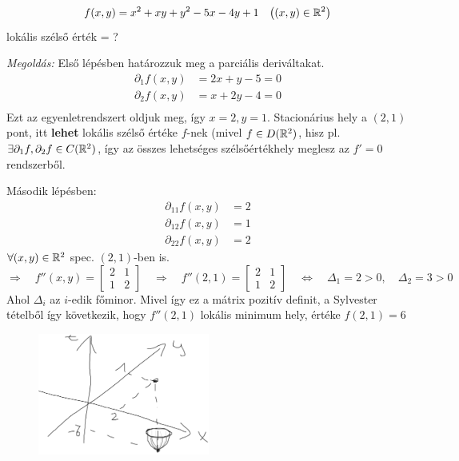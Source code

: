 \documentclass[a4paper,11.5pt]{article}
\begin{document}
	\begin{example}
		\[ f(x,y)=x^2+xy+y^2-5x-4y+1\quad \big((x,y)\in\mathbb{R}^2\big) \]
		lokális szélső érték = ?
		
		\textit{Megoldás:} Első lépésben határozzuk meg a parciális deriváltakat.
		\begin{align*}
			\partial_1f(x,y)&=2x+y-5 = 0\\
			\partial_2f(x,y)&=x+2y-4=0\\
		\end{align*}
		Ezt az egyenletrendszert oldjuk meg, így $x=2, y=1$. Stacionárius hely a $(2,1)$ pont, itt \textbf{lehet} lokális szélső értéke $f$-nek (mivel $f\in D(\mathbb{R}^2)$, hisz pl. $\exists \partial_1f,\partial_2f\in C(\mathbb{R}^2)$, így az összes lehetséges szélsőértékhely meglesz az $f'=0$ rendszerből.
		
		Második lépésben: 
		\begin{align*}
			\partial_{11}f(x,y)&=2 \\
			\partial_{12}f(x,y)&=1 \\
			\partial_{22}f(x,y)&=2 
		\end{align*} 
		$\forall(x,y)\in\mathbb{R}^2$ spec. $(2,1)$-ben is.
		\[ \Rightarrow\quad f''(x,y)=\begin{bmatrix}
			2&1\\
			1&2
		\end{bmatrix}\quad \Rightarrow\quad f''(2,1)=\begin{bmatrix}
			2&1\\
			1&2
		\end{bmatrix}\quad \Leftrightarrow\quad \varDelta_1=2>0,\quad \varDelta_2=3>0 \]
		Ahol $\varDelta_i$ az $i$-edik főminor. Mivel így ez a mátrix pozitív definit, a Sylvester tételből így következik, hogy $f''(2,1)$ lokális minimum hely, értéke $f(2,1)=6$
		\begin{figure}[H]
			\centering
			\includegraphics[height=4cm]{../2zh/kepek/38.png}
			\caption{}
		\end{figure}
	\end{example}
\end{document}
